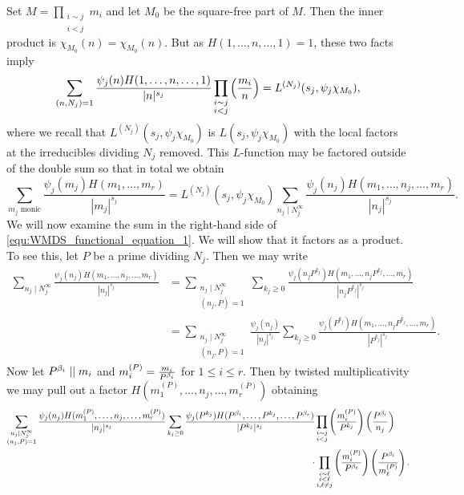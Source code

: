 \documentclass[12pt,reqno,oneside]{amsart}
\begin{document}
    Set $M = \prod_{\substack{i \sim j \\ i < j}}m_{i}$ and let $M_{0}$ be the square-free part of $M$. Then the inner product is $\chi_{M_{0}}(n) = \chi_{M_{0}}(n)$. But as $H(1,\ldots,n,\ldots,1) = 1$, these two facts imply 
    \[
        \sum_{(n,N_{j}) = 1}\frac{\psi_{j}(n)H(1,\ldots,n,\ldots,1)}{|n|^{s_{j}}}\prod_{\substack{i \sim j \\ i < j}}\left(\frac{m_{i}}{n}\right) = L^{(N_{j})}(s_{j},\psi_{j}\chi_{M_{0}}),
    \]
    where we recall that $L^{(N_{j})}(s_{j},\psi_{j}\chi_{M_{0}})$ is $L(s_{j},\psi_{j}\chi_{M_{0}})$ with the local factors at the irreducibles dividing $N_{j}$ removed. This $L$-function may be factored outside of the double sum so that in total we obtain
    \begin{equation}\label{equ:WMDS_functional_equation_1}
        \sum_{\text{$m_{j}$ monic}}\frac{\psi_{j}(m_{j})H(m_{1},\ldots,m_{r})}{|m_{j}|^{s_{j}}} = L^{(N_{j})}(s_{j},\psi_{j}\chi_{M_{0}})\sum_{n_{j} \mid N_{j}^{\infty}}\frac{\psi_{j}(n_{j})H(m_{1},\ldots,n_{j},\ldots,m_{r})}{|n_{j}|^{s_{j}}}.
    \end{equation}
    We will now examine the sum in the right-hand side of \cref{equ:WMDS_functional_equation_1}. We will show that it factors as a product. To see this, let $P$ be a prime dividing $N_{j}$. Then we may write
    \begin{align*}
        \sum_{n_{j} \mid N_{j}^{\infty}}\frac{\psi_{j}(n_{j})H(m_{1},\ldots,n_{j},\ldots,m_{r})}{|n_{j}|^{s_{j}}} &= \sum_{\substack{n_{j} \mid N_{j}^{\infty} \\ (n_{j},P) = 1}}\sum_{k_{j} \ge 0}\frac{\psi_{j}(n_{j}P^{k_{j}})H(m_{1},\ldots,n_{j}P^{k_{j}},\ldots,m_{r})}{|n_{j}P^{k_{j}}|^{s_{j}}} \\
        &= \sum_{\substack{n_{j} \mid N_{j}^{\infty} \\ (n_{j},P) = 1}}\frac{\psi_{j}(n_{j})}{|n_{j}|^{s_{j}}}\sum_{k_{j} \ge 0}\frac{\psi_{j}(P^{k_{j}})H(m_{1},\ldots,n_{j}P^{k_{j}},\ldots,m_{r})}{|P^{k_{j}}|^{s_{j}}}.
    \end{align*}
    Now let $P^{\beta_{i}} \mid\mid m_{i}$ and $m_{i}^{(P)} = \frac{m_{i}}{P^{\beta_{i}}}$ for $1 \le i \le r$. Then by twisted multiplicativity we may pull out a factor $H(m_{1}^{(P)},\ldots,n_{j},\ldots,m_{r}^{(P)})$ obtaining
    \begin{align*}
        \sum_{\substack{n_{j} \mid N_{j}^{\infty} \\ (n_{j},P) = 1}}\frac{\psi_{j}(n_{j})H(m_{1}^{(P)},\ldots,n_{j},\ldots,m_{r}^{(P)})}{|n_{j}|^{s_{j}}}\sum_{k_{j} \ge 0}\frac{\psi_{j}(P^{k_{j}})H(P^{\beta_{1}},\ldots,P^{k_{j}},\ldots,P^{\beta_{r}})}{|P^{k_{j}}|^{s_{j}}}&\prod_{\substack{i \sim j \\ i < j}}\left(\frac{m_{i}^{(P)}}{P^{k_{j}}}\right)\left(\frac{P^{\beta_{i}}}{n_{j}}\right) \\
        \cdot &\prod_{\substack{i \sim \ell \\ i < \ell \\ i,\ell \neq j}}\left(\frac{m_{i}^{(P)}}{P^{\beta_{\ell}}}\right)\left(\frac{P^{\beta_{i}}}{m_{\ell}^{(P)}}\right).
    \end{align*}
\end{document}

